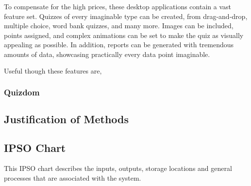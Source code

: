 To compensate for the high prices, these desktop applications contain a vast feature set. Quizzes of every imaginable type can be created, from drag-and-drop, multiple choice, word bank quizzes, and many more. Images can be included, points assigned, and complex animations can be set to make the quiz as visually appealing as possible. In addition, reports can be generated with tremendous amounts of data, showcasing practically every data point imaginable.

Useful though these features are, 

\subsubsection{Quizdom}


\subsection{Justification of Methods}

\subsection{IPSO Chart}
This IPSO chart describes the inputs, outputs, storage locations and general processes that are associated with the system.

